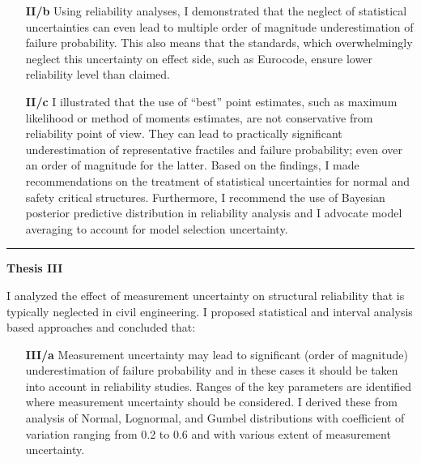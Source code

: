 \begin{enumerate}[leftmargin=*, align=left]
\begin{enumerate}[leftmargin=*, align=left]
  \item[\textbf{II/b}] Using reliability analyses, I demonstrated that the neglect of statistical uncertainties can even lead to multiple order of magnitude underestimation of failure probability. This also means that the standards, which overwhelmingly neglect this uncertainty on effect side, such as Eurocode, ensure lower reliability level than claimed.  
  
  \item[\textbf{II/c}] I illustrated that the use of ``best'' point estimates, such as maximum likelihood or method of moments estimates, are not conservative from reliability point of view. They can lead to practically significant underestimation of representative fractiles and failure probability; even over an order of magnitude for the latter. Based on the findings, I made recommendations on the treatment of statistical uncertainties for normal and safety critical structures. Furthermore, I recommend the use of Bayesian posterior predictive distribution in reliability analysis and I advocate model averaging to account for model selection uncertainty.
  \end{enumerate}
  
  \citep{RozsasEpistemic2014, RozsasESREL2015, RozsasIABSE2015, RozsasMM2015, RozsasTVSB2015, RozsasIdojaras2016}
  
 \begin{center}
  \noindent\rule[0.5ex]{0.5\linewidth}{0.5pt}
  \item[\textbf{Thesis III}] \hfill
 \end{center}
  I analyzed the effect of measurement uncertainty on structural reliability that is typically neglected in civil engineering. I proposed statistical and interval analysis based approaches and concluded that:
    \begin{enumerate}[leftmargin=*, align=left]
      \item[\textbf{III/a}] Measurement uncertainty may lead to significant (order of magnitude) underestimation of failure probability and in these cases it should be taken into account in reliability studies. Ranges of the key parameters are identified where measurement uncertainty should be considered. I derived these from analysis of Normal, Lognormal, and Gumbel distributions with coefficient of variation ranging from 0.2 to 0.6 and with various extent of measurement uncertainty.
      

\end{enumerate}
\end{enumerate}
